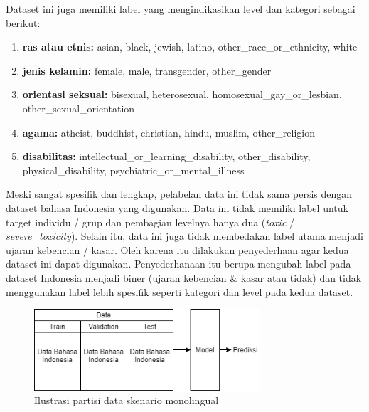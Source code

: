 	Dataset ini juga memiliki label yang mengindikasikan level dan kategori sebagai berikut:
	\begin{enumerate}
		\item \textbf{ras atau etnis:} asian, black, jewish, latino, other\_race\_or\_ethnicity, white
		\item  \textbf{jenis kelamin:} female, male, transgender, other\_gender
		\item  \textbf{orientasi seksual:} bisexual, heterosexual, homosexual\_gay\_or\_lesbian, \\
		other\_sexual\_orientation
		\item \textbf{agama:} atheist, buddhist, christian, hindu, muslim, other\_religion
		\item \textbf{disabilitas:} intellectual\_or\_learning\_disability, other\_disability, physical\_disability, psychiatric\_or\_mental\_illness
	\end{enumerate}

	Meski sangat spesifik dan lengkap, pelabelan data ini tidak sama persis dengan dataset bahasa Indonesia yang digunakan. Data ini tidak memiliki label untuk target individu / grup dan pembagian levelnya hanya dua (\textit{toxic} / \textit{severe\_toxicity}). Selain itu, data ini juga tidak membedakan label utama menjadi ujaran kebencian / kasar. Oleh karena itu dilakukan penyederhaan agar kedua dataset ini dapat digunakan. Penyederhanaan itu berupa mengubah label pada dataset Indonesia menjadi biner (ujaran kebencian \& kasar atau tidak) dan tidak menggunakan label lebih spesifik seperti kategori dan level pada kedua dataset.


	\begin{figure}[]
		\centering
		\includegraphics[width=0.75\textwidth]{resources/Data-tipe-A.png}
		\caption{Ilustrasi partisi data skenario monolingual}
		\label{fig:data_tipe_a}
	\end{figure}


